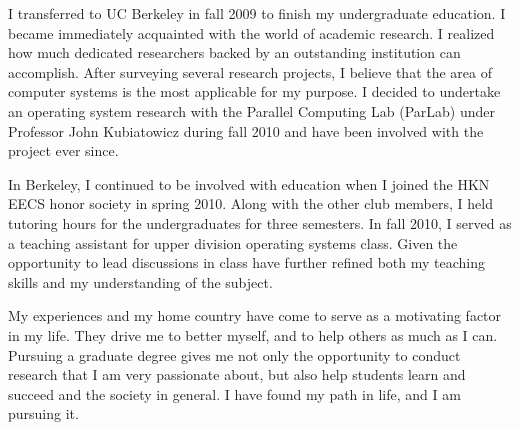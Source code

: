 \documentclass[12pt]{article}
\begin{document}
I transferred to UC Berkeley in fall 2009 to finish my undergraduate education. I became immediately acquainted with the world of academic research. I realized how much dedicated researchers backed by an outstanding institution can accomplish. After surveying several research projects, I believe that the area of computer systems is the most applicable for my purpose. I decided to undertake an operating system research with the Parallel Computing Lab (ParLab) under Professor John Kubiatowicz during fall 2010 and have been involved with the project ever since. \newline

In Berkeley, I continued to be involved with education when I joined the HKN EECS honor society in spring 2010. Along with the other club members, I held tutoring hours for the undergraduates for three semesters. In fall 2010, I served as a teaching assistant for upper division operating systems class. Given the opportunity to lead discussions in class have further refined both my teaching skills and my understanding of the subject. \newline

My experiences and my home country have come to serve as a motivating factor in my life. They drive me to better myself, and to help others as much as I can. Pursuing a graduate degree gives me not only the opportunity to conduct research that I am very passionate about, but also help students learn and succeed and the society in general. I have found my path in life, and I am pursuing it. \newline
\end{document}
